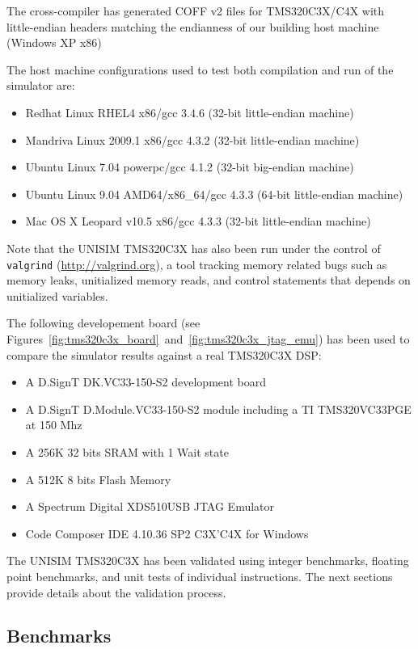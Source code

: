 The cross-compiler has generated COFF v2 files for TMS320C3X/C4X with little-endian headers matching the endianness of our building host machine (Windows XP x86)

\noindent The host machine configurations used to test both compilation and run of the simulator are:
\begin{itemize}
\item Redhat Linux RHEL4 x86/gcc 3.4.6 (32-bit little-endian machine)
\item Mandriva Linux 2009.1 x86/gcc 4.3.2 (32-bit little-endian machine)
\item Ubuntu Linux 7.04 powerpc/gcc 4.1.2 (32-bit big-endian machine)
\item Ubuntu Linux 9.04 AMD64/x86\_64/gcc 4.3.3 (64-bit little-endian machine)
\item Mac OS X Leopard v10.5 x86/gcc 4.3.3 (32-bit little-endian machine)
\end{itemize}

Note that the UNISIM TMS320C3X has also been run under the control of \texttt{valgrind} (\url{http://valgrind.org}), a tool tracking memory related bugs such as memory leaks, unitialized memory reads, and control statements that depends on unitialized variables.

The following developement board (see Figures~\ref{fig:tms320c3x_board}~and~\ref{fig:tms320c3x_jtag_emu}) has been used to compare the simulator results against a real TMS320C3X DSP:
\begin{itemize}
\item A D.SignT DK.VC33-150-S2 development board
\item A D.SignT D.Module.VC33-150-S2 module including a TI TMS320VC33PGE at 150 Mhz
\item A 256K 32 bits SRAM with 1 Wait state
\item A 512K 8 bits Flash Memory
\item A Spectrum Digital XDS510USB JTAG Emulator
\item Code Composer IDE 4.10.36 SP2 C3X'C4X for Windows
\end{itemize}

The UNISIM TMS320C3X has been validated using integer benchmarks, floating point benchmarks, and unit tests of individual instructions.
The next sections provide details about the validation process.

\subsection{Benchmarks}

